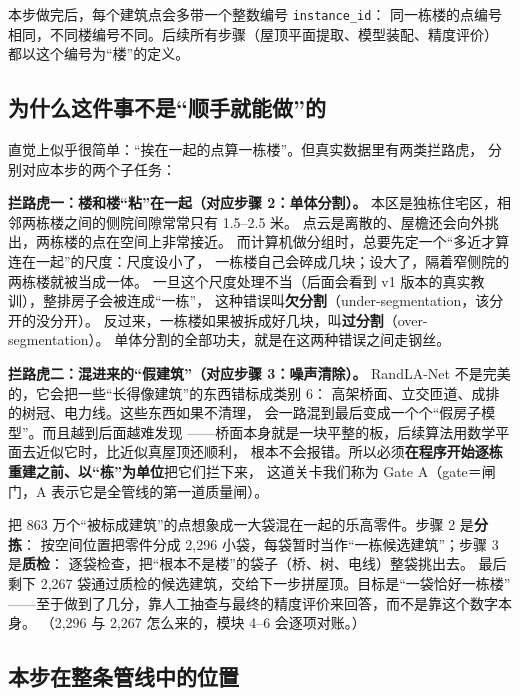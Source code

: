 本步做完后，每个建筑点会多带一个整数编号 \texttt{instance\_id}：
同一栋楼的点编号相同，不同楼编号不同。后续所有步骤（屋顶平面提取、模型装配、精度评价）
都以这个编号为``楼''的定义。

\subsection{为什么这件事不是``顺手就能做''的}

直觉上似乎很简单：``挨在一起的点算一栋楼''。但真实数据里有两类拦路虎，
分别对应本步的两个子任务：

\textbf{拦路虎一：楼和楼``粘''在一起（对应步骤 2：单体分割）。}
本区是独栋住宅区，相邻两栋楼之间的侧院间隙常常只有 1.5--2.5 米。
点云是离散的、屋檐还会向外挑出，两栋楼的点在空间上非常接近。
而计算机做分组时，总要先定一个``多近才算连在一起''的尺度：尺度设小了，
一栋楼自己会碎成几块；设大了，隔着窄侧院的两栋楼就被当成一体。
一旦这个尺度处理不当（后面会看到 v1 版本的真实教训），整排房子会被连成``一栋''，
这种错误叫\textbf{欠分割}（under-segmentation，该分开的没分开）。
反过来，一栋楼如果被拆成好几块，叫\textbf{过分割}（over-segmentation）。
单体分割的全部功夫，就是在这两种错误之间走钢丝。

\textbf{拦路虎二：混进来的``假建筑''（对应步骤 3：噪声清除）。}
RandLA-Net 不是完美的，它会把一些``长得像建筑''的东西错标成类别 6：
高架桥面、立交匝道、成排的树冠、电力线。这些东西如果不清理，
会一路混到最后变成一个个``假房子模型''。而且越到后面越难发现
——桥面本身就是一块平整的板，后续算法用数学平面去近似它时，比近似真屋顶还顺利，
根本不会报错。所以必须\textbf{在程序开始逐栋重建之前、以``栋''为单位}把它们拦下来，
这道关卡我们称为 Gate A（gate＝闸门，A 表示它是全管线的第一道质量闸）。

\begin{plainbox}[：一个比喻串起两个子任务]
把 863 万个``被标成建筑''的点想象成一大袋混在一起的乐高零件。步骤 2 是\textbf{分拣}：
按空间位置把零件分成 2{,}296 小袋，每袋暂时当作``一栋候选建筑''；步骤 3 是\textbf{质检}：
逐袋检查，把``根本不是楼''的袋子（桥、树、电线）整袋挑出去。
最后剩下 2{,}267 袋通过质检的候选建筑，交给下一步拼屋顶。目标是``一袋恰好一栋楼''
——至于做到了几分，靠人工抽查与最终的精度评价来回答，而不是靠这个数字本身。
（2{,}296 与 2{,}267 怎么来的，模块 4--6 会逐项对账。）
\end{plainbox}

\subsection{本步在整条管线中的位置}

